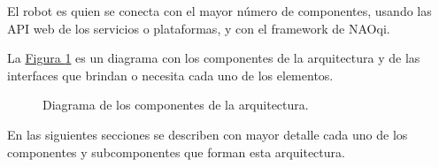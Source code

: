 El robot es quien se conecta con el mayor número de componentes, usando las API
web de los servicios o plataformas, y con el framework de NAOqi.

La \hyperref[\detokenize{chapter_two/desc_cloudnao:cn-components-diagram}]{Figura \ref{\detokenize{chapter_two/desc_cloudnao:cn-components-diagram}}} es un diagrama con los
componentes de la arquitectura y de las interfaces que brindan o necesita cada
uno de los elementos.

\begin{figure}[htbp]
\centering
\capstart

\noindent{}
\caption{Diagrama de los componentes de la arquitectura.}\label{\detokenize{chapter_two/desc_cloudnao:cn-components-diagram}}\end{figure}

En las siguientes secciones se describen con mayor detalle cada uno de los
componentes y subcomponentes que forman esta arquitectura.

